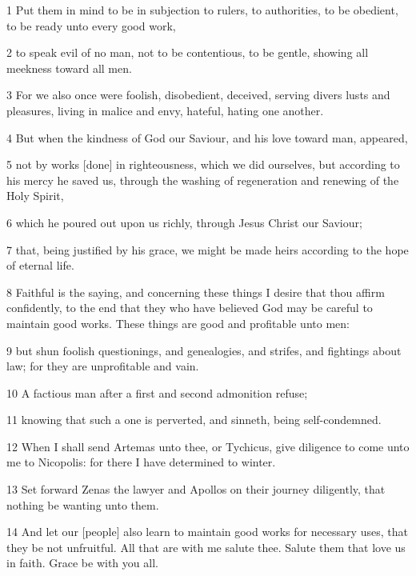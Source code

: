 \par 1 Put them in mind to be in subjection to rulers, to authorities, to be obedient, to be ready unto every good work,
\par 2 to speak evil of no man, not to be contentious, to be gentle, showing all meekness toward all men.
\par 3 For we also once were foolish, disobedient, deceived, serving divers lusts and pleasures, living in malice and envy, hateful, hating one another.
\par 4 But when the kindness of God our Saviour, and his love toward man, appeared,
\par 5 not by works [done] in righteousness, which we did ourselves, but according to his mercy he saved us, through the washing of regeneration and renewing of the Holy Spirit,
\par 6 which he poured out upon us richly, through Jesus Christ our Saviour;
\par 7 that, being justified by his grace, we might be made heirs according to the hope of eternal life.
\par 8 Faithful is the saying, and concerning these things I desire that thou affirm confidently, to the end that they who have believed God may be careful to maintain good works. These things are good and profitable unto men:
\par 9 but shun foolish questionings, and genealogies, and strifes, and fightings about law; for they are unprofitable and vain.
\par 10 A factious man after a first and second admonition refuse;
\par 11 knowing that such a one is perverted, and sinneth, being self-condemned.
\par 12 When I shall send Artemas unto thee, or Tychicus, give diligence to come unto me to Nicopolis: for there I have determined to winter.
\par 13 Set forward Zenas the lawyer and Apollos on their journey diligently, that nothing be wanting unto them.
\par 14 And let our [people] also learn to maintain good works for necessary uses, that they be not unfruitful. All that are with me salute thee. Salute them that love us in faith. Grace be with you all.

